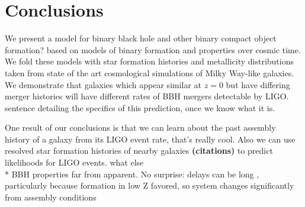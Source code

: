 \documentclass[nofootinbib,twocolumn,prd]{emulateapj}
\newcommand\editremark[1]{{\color{red}#1}}
\newcommand\jillianremark[1]{{\color{blue}#1}}
\begin{document}






\section{Conclusions}

We present a model for binary black hole \jillianremark {and other binary compact object formation?} based on models of binary formation and properties over cosmic time.  We fold these models with star formation histories and metallicity distributions taken from state of the art cosmological simulations of Milky Way-like galaxies.  We demonstrate that galaxies which appear similar at $z = 0$ but have differing merger histories will have different rates of BBH mergers detectable by LIGO.  \jillianremark{sentence detailing the specifics of this prediction, once we know what it is.}   

One result of our conclusions is that we can learn about the past assembly history of a galaxy from its LIGO event rate, \jillianremark{ that's really cool.  }  Also we can use resolved star formation histories of nearby galaxies {\bf (citations)} to predict likelihoods for LIGO events.  \jillianremark { what else}\\


* BBH properties far from apparent.  No surprise: delays can be long \cite{PSellipticals,popsyn-LowMetallicityImpact2b-StarTrackRevised-2013,gwastro-EventPopsynPaper-2016}, particularly because formation in low Z favored,
so system changes significantly from assembly conditions
\end{document}
